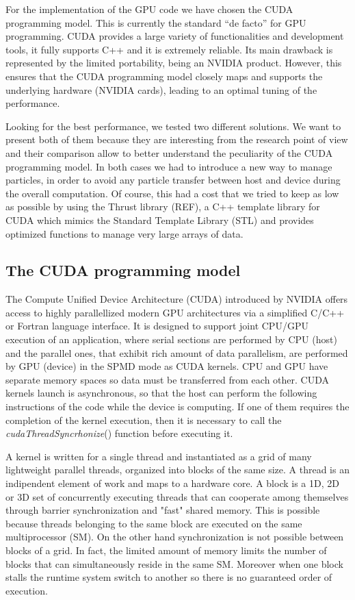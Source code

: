 \documentclass[11pt]{article}
\begin{document}
For the implementation of the GPU code we have chosen the CUDA programming
model. This is currently the standard ``de facto'' for GPU programming.
CUDA provides a large variety of functionalities and
development tools, it fully supports C++ and it is extremely reliable. Its main drawback is
represented by the limited portability, being an NVIDIA product. However, 
this ensures that the CUDA programming model closely maps and supports the underlying 
hardware (NVIDIA cards), leading to an optimal tuning of the performance.  

Looking for the best performance, we tested two different solutions. We want to present both of them because they are interesting from the research point of view and their comparison allow to better understand the peculiarity of the CUDA programming model. In both cases we had to introduce a new way to manage particles, in order to avoid any particle transfer between host and device during the overall computation. Of course, this had a cost that we tried to keep as low as possible by using the Thrust library (REF), a C++ template library for CUDA which mimics the Standard Template Library (STL) and provides optimized functions to manage very large arrays of data.  

\subsection{The CUDA programming model}

The Compute Unified Device Architecture (CUDA) introduced by NVIDIA offers access to highly parallellized modern GPU architectures via a simplified C/C++ or Fortran language interface. It is designed to support joint CPU/GPU execution of an application, where serial sections are performed by CPU (host) and the parallel ones, that exhibit rich amount of data parallelism, are performed by GPU (device) in the SPMD mode as CUDA kernels. CPU and GPU have separate memory spaces so data must be transferred from each other. CUDA kernels launch is asynchronous, so that the host can perform the following instructions of the code while the device is computing. If one of them requires the completion of the kernel execution, then it is necessary to call the \textit{cudaThreadSyncrhonize}() function before executing it. 

A kernel is written for a single thread and instantiated as a grid of many lightweight parallel threads, organized into blocks of the same size. 
A thread is an indipendent element of work and maps to a hardware core. A block is a 1D, 2D or 3D set of concurrently executing threads that can cooperate among themselves through barrier synchronization and "fast" shared memory. This is possible because threads belonging to the same block are executed on the same multiprocessor (SM). On the other hand synchronization is not possible between blocks of a grid. In fact, the limited amount of memory limits the number of blocks that can simultaneously reside in the same SM. Moreover when one block stalls the runtime system switch to another so there is no guaranteed order of execution.
\end{document}
